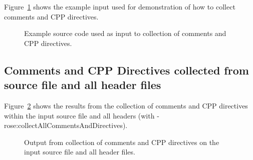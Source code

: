    Figure~\ref{Tutorial:exampleInputCode_collectDefineDirectives}
shows the example input used for demonstration of how to collect comments and CPP directives.

\begin{figure}[!h]
{\indent
{\mySmallFontSize

\begin{latexonly}
   
\end{latexonly}

\begin{htmlonly}
   
\end{htmlonly}

}
}
\caption{Example source code used as input to collection of comments and CPP directives.}
\label{Tutorial:exampleInputCode_collectDefineDirectives}
\end{figure}


\subsection{Comments and CPP Directives collected from source file and all header files}

   Figure~\ref{Tutorial:exampleOutput_collectDefineDirectives} 
shows the results from the collection of comments and CPP directives within the input
source file and all headers (with -rose:collectAllCommentsAndDirectives).

\begin{figure}[!h]
{\indent
{\mySmallFontSize

\begin{latexonly}
   
\end{latexonly}

\begin{htmlonly}
   
\end{htmlonly}

}
}
\caption{Output from collection of comments and CPP directives on the input source file
    and all header files.}
\label{Tutorial:exampleOutput_collectDefineDirectives}
\end{figure}





